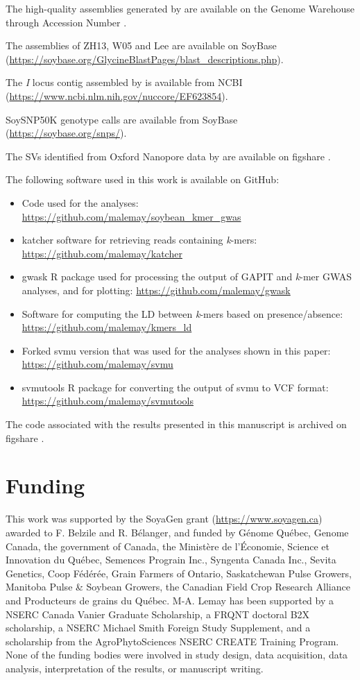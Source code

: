 The high-quality assemblies generated by \cite{liu2020-pangenome} are available
on the Genome Warehouse through Accession Number \citeauthor{PRJCA002030}.

The assemblies of ZH13, W05 and Lee are available on SoyBase
(\url{https://soybase.org/GlycineBlastPages/blast_descriptions.php}).

The \textit{I} locus contig assembled by \cite{tuteja2008} is available from
NCBI (\url{https://www.ncbi.nlm.nih.gov/nuccore/EF623854}).

SoySNP50K genotype calls are available from SoyBase (\url{https://soybase.org/snps/}).

The SVs identified from Oxford Nanopore data by \cite{lemay2022} are available
on figshare \citep{soybean-sv-figshare}.

The following software used in this work is available on GitHub:

\begin{itemize}
	\item Code used for the analyses:
		\url{https://github.com/malemay/soybean_kmer_gwas}
	\item katcher software for retrieving reads containing \textit{k}-mers:
		\url{https://github.com/malemay/katcher}
	\item gwask R package used for processing the output of GAPIT and
		\textit{k}-mer GWAS analyses, and for plotting:
		\url{https://github.com/malemay/gwask}
	\item Software for computing the LD between \textit{k}-mers
		based on presence/absence: \url{https://github.com/malemay/kmers_ld}
	\item Forked svmu version that was used for the analyses shown in this
		paper: \url{https://github.com/malemay/svmu}
	\item svmutools R package for converting the output of svmu to VCF
		format: \url{https://github.com/malemay/svmutools}
\end{itemize}

The code associated with the results presented in this manuscript is archived
on figshare \citep{kmer-gwas-code}.

\section*{Funding}
\label{sv-gwas-funding}

This work was supported by the SoyaGen grant (\url{https://www.soyagen.ca})
awarded to F. Belzile and R. Bélanger, and funded by Génome Québec, Genome
Canada, the government of Canada, the Ministère de l'Économie, Science et
Innovation du Québec, Semences Prograin Inc., Syngenta Canada Inc., Sevita
Genetics, Coop Fédérée, Grain Farmers of Ontario, Saskatchewan Pulse Growers,
Manitoba Pulse \& Soybean Growers, the Canadian Field Crop Research Alliance
and Producteurs de grains du Québec. M-A. Lemay has been supported by a NSERC
Canada Vanier Graduate Scholarship, a FRQNT doctoral B2X scholarship, a NSERC
Michael Smith Foreign Study Supplement, and a scholarship from the
AgroPhytoSciences NSERC CREATE Training Program. None of the funding bodies
were involved in study design, data acquisition, data analysis, interpretation
of the results, or manuscript writing.

